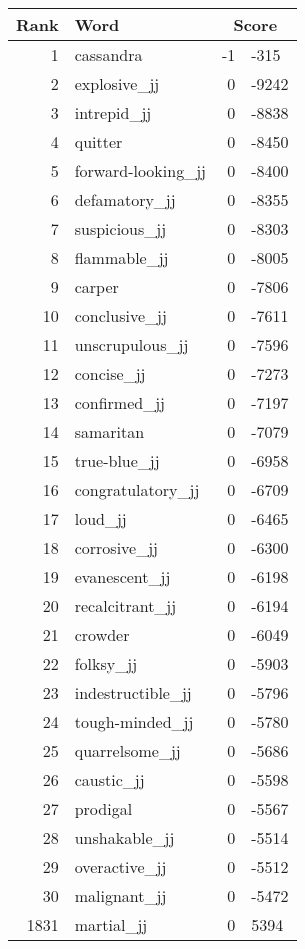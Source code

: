 \begin{longtable}[!htbp]{| rlr@{.}l |}
    \hline
    \textbf{Rank} & \textbf{Word} & \multicolumn{2}{c|}{\textbf{Score}} \\
    \hline
    \endhead
    1 & cassandra & -1 & -315 \\
    2 & explosive\_jj & 0 & -9242 \\
    3 & intrepid\_jj & 0 & -8838 \\
    4 & quitter & 0 & -8450 \\
    5 & forward-looking\_jj & 0 & -8400 \\
    6 & defamatory\_jj & 0 & -8355 \\
    7 & suspicious\_jj & 0 & -8303 \\
    8 & flammable\_jj & 0 & -8005 \\
    9 & carper & 0 & -7806 \\
    10 & conclusive\_jj & 0 & -7611 \\
    11 & unscrupulous\_jj & 0 & -7596 \\
    12 & concise\_jj & 0 & -7273 \\
    13 & confirmed\_jj & 0 & -7197 \\
    14 & samaritan & 0 & -7079 \\
    15 & true-blue\_jj & 0 & -6958 \\
    16 & congratulatory\_jj & 0 & -6709 \\
    17 & loud\_jj & 0 & -6465 \\
    18 & corrosive\_jj & 0 & -6300 \\
    19 & evanescent\_jj & 0 & -6198 \\
    20 & recalcitrant\_jj & 0 & -6194 \\
    21 & crowder & 0 & -6049 \\
    22 & folksy\_jj & 0 & -5903 \\
    23 & indestructible\_jj & 0 & -5796 \\
    24 & tough-minded\_jj & 0 & -5780 \\
    25 & quarrelsome\_jj & 0 & -5686 \\
    26 & caustic\_jj & 0 & -5598 \\
    27 & prodigal & 0 & -5567 \\
    28 & unshakable\_jj & 0 & -5514 \\
    29 & overactive\_jj & 0 & -5512 \\
    30 & malignant\_jj & 0 & -5472 \\
    1831 & martial\_jj & 0 & 5394 \\

\end{longtable}
